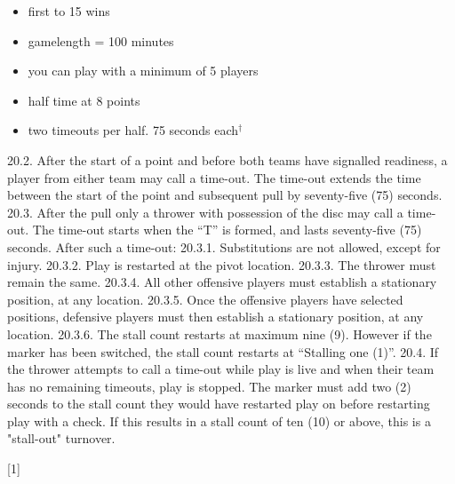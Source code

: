\small{
    \begin{itemize}
        \item first to 15 wins
        \item gamelength = 100 minutes
        \item you can play with a minimum of 5 players
        \item half time at 8 points
        \item two timeouts per half. 75 seconds each$^\dagger$
    \end{itemize}
}

20.2. After the start of a point and before both teams have signalled readiness, a player from either team may
call a time-out. The time-out extends the time between the start of the point and subsequent pull by
seventy-five (75) seconds.
20.3. After the pull only a thrower with possession of the disc may call a time-out. The time-out starts when
the “T” is formed, and lasts seventy-five (75) seconds. After such a time-out:
20.3.1. Substitutions are not allowed, except for injury.
20.3.2. Play is restarted at the pivot location.
20.3.3. The thrower must remain the same.
20.3.4. All other offensive players must establish a stationary position, at any location.
20.3.5. Once the offensive players have selected positions, defensive players must then establish a
stationary position, at any location.
20.3.6. The stall count restarts at maximum nine (9). However if the marker has been switched, the
stall count restarts at “Stalling one (1)”.
20.4. If the thrower attempts to call a time-out while play is live and when their team has no remaining timeouts, play is stopped. The marker must add two (2) seconds to the stall count they would have
restarted play on before restarting play with a check. If this results in a stall count of ten (10) or above,
this is a "stall-out" turnover.

\begin{center}[1]\end{center}
